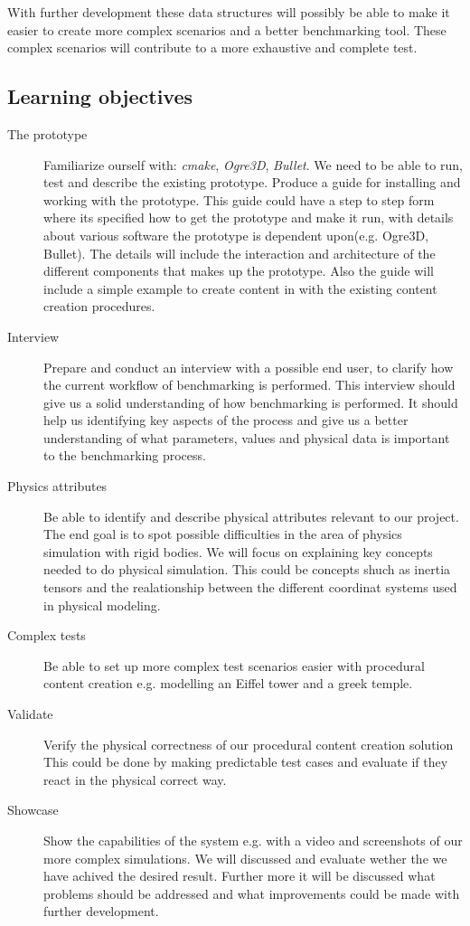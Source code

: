 \documentclass[a4paper, 10pt]{article}
\begin{document}
With further development these data structures will possibly be able to make it easier to create more complex scenarios
and a better benchmarking tool. These complex scenarios will contribute to a more exhaustive and complete test.
\subsection*{Learning objectives}
\begin{description}
\item[The prototype] 	Familiarize ourself with: \emph{cmake}, \emph{Ogre3D}, \emph{Bullet}. 
			We need to be able to run, test and describe the existing prototype.
			Produce a guide for installing and working with the prototype. This guide could have a step to step form
			where its specified how to get the prototype and make it run, with details 
			about various software the prototype is dependent upon(e.g. Ogre3D, Bullet).
			The details will include the interaction and architecture of the different components that
			makes up the prototype. Also the guide will include a simple example to create content in with the
			existing content creation procedures.

\item[Interview] Prepare and conduct an interview with a possible end user, to clarify how the current workflow of benchmarking is performed.
 		This interview should give us a solid understanding of how benchmarking is performed. It should help us
		identifying key aspects of the process and give us a better understanding of what parameters, values and physical data
		is important to the benchmarking process.
\item[Physics attributes]Be able to identify and describe physical attributes relevant to our project. The end goal is to spot possible difficulties in the
			area of physics simulation with rigid bodies. We will focus on explaining key concepts needed to
			do physical simulation. This could be concepts shuch as inertia tensors and the realationship between the different coordinat
			 systems used in physical modeling.
\item[Complex tests] Be able to set up more complex test scenarios easier with procedural content creation e.g. modelling an Eiffel tower and a
			greek temple.
\item[Validate] Verify the physical correctness of our procedural content creation solution 
		This could be done by making predictable test cases and evaluate if they react in the physical correct way. 
\item[Showcase] Show the capabilities of the system e.g. with a video and screenshots of our more complex simulations. We will discussed and
		evaluate wether the we have achived the desired result. Further more it will be discussed what
		problems should be addressed and what improvements could be made with further development.
\end{description}
\end{document}
